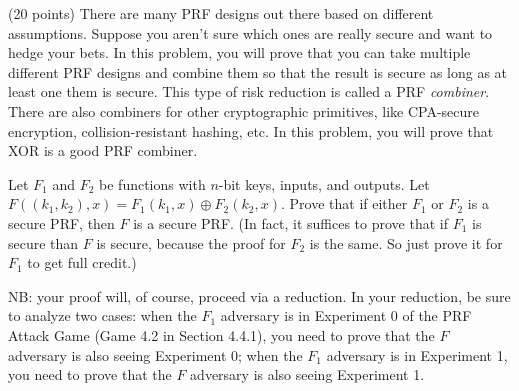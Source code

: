 \documentclass[12pt]{article}
\theoremstyle{plain}
\theoremstyle{definition}
\begin{document}
\begin{problem} (20 points)
There are many PRF designs out there based on different assumptions. Suppose you aren't sure which ones are really secure and want to hedge your bets. In this problem, you will prove that you can take multiple different PRF designs and combine them  so that the result is secure as long as at least one them is secure. This type of risk reduction is called a PRF \emph{combiner}.  There are also combiners for other cryptographic primitives, like CPA-secure encryption, collision-resistant hashing, etc. In this problem, you will prove that XOR is a good PRF combiner.

Let $F_1$ and $F_2$ be functions with $n$-bit keys, inputs, and outputs. Let $F((k_1, k_2), x) = F_1(k_1, x)\oplus F_2(k_2, x)$. Prove that if either $F_1$ or $F_2$ is a secure PRF, then $F$ is a secure PRF.  (In fact, it suffices to prove that if $F_1$ is secure than $F$ is secure, because the proof for $F_2$ is the same. So just prove it for $F_1$ to get full credit.)

NB: your proof will, of course, proceed via a reduction. In your reduction, be sure to analyze two cases: when the $F_1$ adversary is in Experiment 0 of the PRF Attack Game (Game 4.2 in Section 4.4.1), you need to prove that the $F$ adversary is also seeing Experiment 0; when the $F_1$ adversary is in Experiment 1, you need to prove that the $F$ adversary is also seeing Experiment 1.
 \end{problem}
\end{document}

